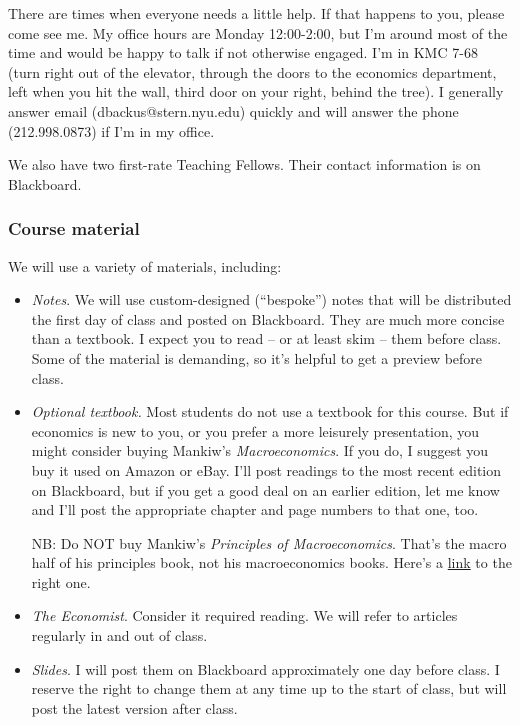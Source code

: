 \documentclass[letterpaper,12pt]{article}
\begin{document}
There are times when everyone needs a little help. 
If that happens to you, please come see me.  
My office hours are Monday 12:00-2:00, 
but I'm around most of the time and would be happy to talk 
if not otherwise engaged.   
I'm in KMC 7-68 (turn right
out of the elevator, through the doors to the economics department, 
left when you hit the wall, third door on your right, behind the tree).  
I generally answer email (dbackus@stern.nyu.edu) quickly 
and will answer the phone (212.998.0873) if I'm in my office.  

We also have two first-rate Teaching Fellows.
Their contact information is on Blackboard.  


\subsubsection*{Course material}

We will use a variety of materials, including:  
%
\begin{itemize}

\item {\it Notes\/}.  
We will use custom-designed (``bespoke'') notes that will be
distributed the first day of class and posted on Blackboard.
They are much more concise than a textbook. 
I expect you to read -- or at least skim -- them before class.  
Some of the material is demanding, so it's helpful to get a preview
before class.  

\item {\it Optional textbook.\/} 
Most students do not use a textbook for this course.
But if economics is new to you, or you prefer a more leisurely
presentation, you might consider buying 
Mankiw's {\it Macroeconomics\/}.
If you do, I suggest you buy it used on Amazon or eBay.  
I'll post readings to the most recent edition on Blackboard, 
but if you get a good deal on an earlier edition, 
let me know and I'll post the appropriate chapter and page numbers
to that one, too.   

NB:  Do NOT buy Mankiw's {\it Principles of Macroeconomics\/}.
That's the macro half of his principles book, not 
his macroeconomics books.  
Here's a 
\href{http://www.amazon.com/Macroeconomics-N-Gregory-Mankiw/dp/0716762137/ref=pd_bbs_sr_3?ie=UTF8&s=books&qid=1196705962&sr=8-3}
{link} 
to the right one.  

\item {\it The Economist\/}.    
Consider it required reading.  
We will refer to articles regularly in and out of class.  

\item {\it Slides\/}.  
I will post them on Blackboard approximately one day before class.
I reserve the right to change them at any time up to the start of class, 
but will post the latest version after class.    

\end{itemize}
\end{document}
